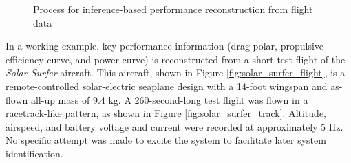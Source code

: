 \documentclass[12pt,vi,oneside,table]{report}
\begin{document}
    \begin{figure}[h]
        \centering
        \caption{Process for inference-based performance reconstruction from flight data}
        \label{fig:overall_procedure}
    \end{figure}

    In a working example, key performance information (drag polar, propulsive efficiency curve, and power curve) is reconstructed from a short test flight of the \textit{Solar Surfer} aircraft. This aircraft, shown in Figure \ref{fig:solar_surfer_flight}, is a remote-controlled solar-electric seaplane design with a 14-foot wingspan and as-flown all-up mass of 9.4 kg. A 260-second-long test flight was flown in a racetrack-like pattern, as shown in Figure \ref{fig:solar_surfer_track}. Altitude, airspeed, and battery voltage and current were recorded at approximately 5 Hz. No specific attempt was made to excite the system to facilitate later system identification.
\end{document}
